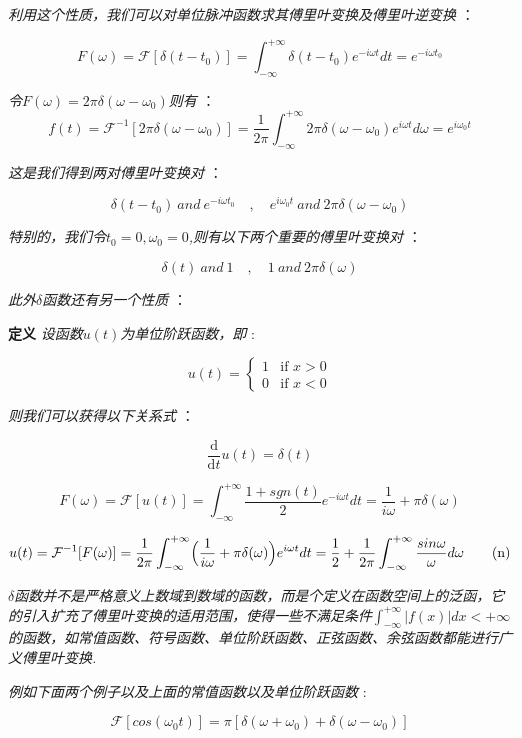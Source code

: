 \textit{利用这个性质，我们可以对单位脉冲函数求其傅里叶变换及傅里叶逆变换} ：

\[F(\omega)=\mathcal{F}[\delta(t-t_0)]=\int_{-\infty}^{+\infty}\delta(t-t_0)e^{-i\omega t}dt=e^{-i\omega t_0}\]

\textit{令$F(\omega)=2\pi \delta(\omega-\omega_0)$则有} ： 
\[f(t)=\mathcal{F}^{-1}[2\pi \delta(\omega-\omega_0)]=\frac{1}{2\pi}\int_{-\infty}^{+\infty}2\pi \delta(\omega-\omega_0)e^{i\omega t}d\omega=e^{i\omega_0 t}\]

\textit{这是我们得到两对傅里叶变换对} ：

\[\delta(t-t_0) \ and \ e^{-i\omega t_0} \quad,\quad e^{i\omega_0 t} \ and \ 2\pi \delta(\omega-\omega_0) \tag{l}\]

\textit{特别的，我们令$t_0=0,\omega_0=0$,则有以下两个重要的傅里叶变换对} ：

\[\delta(t) \ and \ 1 \quad,\quad 1 \ and \ 2\pi \delta(\omega) \tag{m}\]

\textit{此外$\delta$函数还有另一个性质} ：

\textbf{定义} \qquad \textit{设函数$u(t)$为单位阶跃函数，即} :

\[u(t)=\left\{ \begin{array}{rl}
1 & \text{if } x>0 \\
0 & \text{if } x<0 
\end{array} \right. \]

\textit{则我们可以获得以下关系式 }：

\[\frac{\mathrm{d}}{\mathrm{d} t}u(t)=\delta(t)\]

\[F(\omega)=\mathcal{F}[u(t)]=\int_{-\infty}^{+\infty}\frac{1+sgn(t)}{2}e^{-i\omega t}dt=\frac{1}{i\omega}+\pi\delta(\omega)\]

\[u(t)=\mathcal{F}^{-1}[F(\omega)]=\frac{1}{2\pi}\int_{-\infty}^{+\infty}\Bigl(\frac{1}{i\omega}+\pi\delta(\omega) \Bigl)e^{i\omega t}dt=\frac{1}{2}+\frac{1}{2\pi}\int_{-\infty}^{+\infty}\frac{sin\omega}{\omega}d\omega \tag{n}\]

\textit{$\delta$函数并不是严格意义上数域到数域的函数，而是个定义在函数空间上的泛函，它的引入扩充了傅里叶变换的适用范围，使得一些不满足条件$\int_{-\infty}^{+\infty}|f(x)|dx<+\infty$的函数，如常值函数、符号函数、单位阶跃函数、正弦函数、余弦函数都能进行广义傅里叶变换.}

\textit{例如下面两个例子以及上面的常值函数以及单位阶跃函数 }:

\[\mathcal{F}[cos(\omega_0t)]=\pi[\delta(\omega+\omega_0)+\delta(\omega-\omega_0)] \tag{o1}\]


